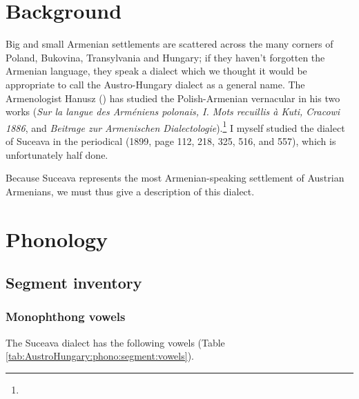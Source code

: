 \section{Background}


\begin{adjarianpage}\label{page:270}\end{adjarianpage}%

Big and small Armenian settlements are scattered across the many corners of Poland, Bukovina, Transylvania and Hungary; if they haven't forgotten the Armenian language, they speak a dialect which we thought it would be appropriate to call the Austro-Hungary dialect as a general name. The Armenologist Hanusz () has studied the Polish-Armenian vernacular in his two works (\textit{Sur la langue des Arméniens polonais, I. Mots recuillis à Kuti, Cracowi 1886}, and \textit{Beitrage zur Armenischen Dialectologie}).\footnote{} I myself studied the dialect of Suceava in the  periodical (1899, page 112, 218, 325, 516, and 557), which is unfortunately half done. 

Because Suceava represents the most Armenian-speaking settlement of Austrian Armenians, we must thus give a description of this dialect. 

\section{Phonology}
\subsection{Segment inventory}
\subsubsection{Monophthong vowels}

The Suceava dialect has the following vowels (Table \ref{tab:AustroHungary:phono:segment:vowels}). 




